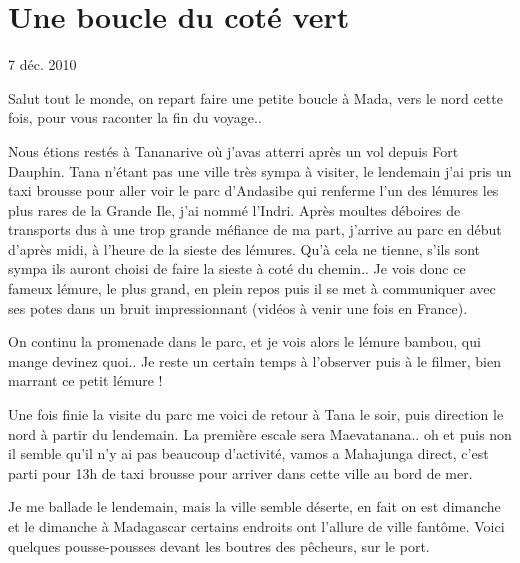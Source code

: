 \section{Une boucle du coté vert}

7 déc. 2010

\begin{multicols}{2}

Salut tout le monde, on repart faire une petite boucle à Mada, vers le nord cette fois, pour vous raconter la fin du voyage..

Nous étions restés à Tananarive où j'avas atterri après un vol depuis Fort Dauphin. Tana n'étant pas une ville très sympa à visiter, le lendemain j'ai pris un taxi brousse pour aller voir le parc d'Andasibe qui renferme l'un des lémures les plus rares de la Grande Ile, j'ai nommé l'Indri. Après moultes déboires de transports dus à une trop grande méfiance de ma part, j'arrive au parc en début d'après midi, à l'heure de la sieste des lémures. Qu'à cela ne tienne, s'ils sont sympa ils auront choisi de faire la sieste à coté du chemin.. Je vois donc ce fameux lémure, le plus grand, en plein repos puis il se met à communiquer avec ses potes dans un bruit impressionnant (vidéos à venir une fois en France).


On continu la promenade dans le parc, et je vois alors le lémure bambou, qui mange devinez quoi.. Je reste un certain temps à l'observer puis à le filmer, bien marrant ce petit lémure !


Une fois finie la visite du parc me voici de retour à Tana le soir, puis direction le nord à partir du lendemain. La première escale sera Maevatanana.. oh et puis non il semble qu'il n'y ai pas beaucoup d'activité, vamos a Mahajunga direct, c'est parti pour 13h de taxi brousse pour arriver dans cette ville au bord de mer.

Je me ballade le lendemain, mais la ville semble déserte, en fait on est dimanche et le dimanche à Madagascar certains endroits ont l'allure de ville fantôme. Voici quelques pousse-pousses devant les boutres des pêcheurs, sur le port.



\end{multicols}
